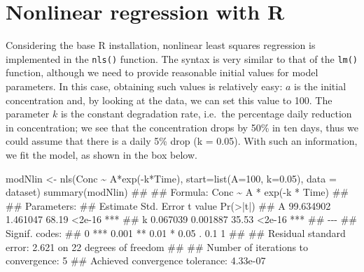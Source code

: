 \documentclass[a4paper,12pt,oneside]{book}
\newenvironment{Shaded}{\begin{snugshade}}{\end{snugshade}}
\newcommand{\DecValTok}[1]{#1}
\newcommand{\FloatTok}[1]{#1}
\newcommand{\SpecialCharTok}[1]{#1}
\newcommand{\DocumentationTok}[1]{#1}
\newcommand{\OtherTok}[1]{#1}
\newcommand{\FunctionTok}[1]{#1}
\newcommand{\AttributeTok}[1]{#1}
\newcommand{\NormalTok}[1]{#1}
\begin{document}
\hypertarget{nonlinear-regression-with-r}{%
\section{Nonlinear regression with R}\label{nonlinear-regression-with-r}}

Considering the base R installation, nonlinear least squares regression is implemented in the \texttt{nls()} function. The syntax is very similar to that of the \texttt{lm()} function, although we need to provide reasonable initial values for model parameters. In this case, obtaining such values is relatively easy: \(a\) is the initial concentration and, by looking at the data, we can set this value to 100. The parameter \(k\) is the constant degradation rate, i.e.~the percentage daily reduction in concentration; we see that the concentration drops by 50\% in ten days, thus we could assume that there is a daily 5\% drop (k = 0.05). With such an information, we fit the model, as shown in the box below.

\begin{Shaded}
\begin{Highlighting}[]
\NormalTok{modNlin }\OtherTok{\textless{}{-}} \FunctionTok{nls}\NormalTok{(Conc }\SpecialCharTok{\textasciitilde{}}\NormalTok{ A}\SpecialCharTok{*}\FunctionTok{exp}\NormalTok{(}\SpecialCharTok{{-}}\NormalTok{k}\SpecialCharTok{*}\NormalTok{Time), }
               \AttributeTok{start=}\FunctionTok{list}\NormalTok{(}\AttributeTok{A=}\DecValTok{100}\NormalTok{, }\AttributeTok{k=}\FloatTok{0.05}\NormalTok{), }
               \AttributeTok{data =}\NormalTok{ dataset)}
\FunctionTok{summary}\NormalTok{(modNlin)}
\DocumentationTok{\#\# }
\DocumentationTok{\#\# Formula: Conc \textasciitilde{} A * exp({-}k * Time)}
\DocumentationTok{\#\# }
\DocumentationTok{\#\# Parameters:}
\DocumentationTok{\#\#    Estimate Std. Error t value Pr(\textgreater{}|t|)    }
\DocumentationTok{\#\# A 99.634902   1.461047   68.19   \textless{}2e{-}16 ***}
\DocumentationTok{\#\# k  0.067039   0.001887   35.53   \textless{}2e{-}16 ***}
\DocumentationTok{\#\# {-}{-}{-}}
\DocumentationTok{\#\# Signif. codes:  }
\DocumentationTok{\#\# 0 \textquotesingle{}***\textquotesingle{} 0.001 \textquotesingle{}**\textquotesingle{} 0.01 \textquotesingle{}*\textquotesingle{} 0.05 \textquotesingle{}.\textquotesingle{} 0.1 \textquotesingle{} \textquotesingle{} 1}
\DocumentationTok{\#\# }
\DocumentationTok{\#\# Residual standard error: 2.621 on 22 degrees of freedom}
\DocumentationTok{\#\# }
\DocumentationTok{\#\# Number of iterations to convergence: 5 }
\DocumentationTok{\#\# Achieved convergence tolerance: 4.33e{-}07}
\end{Highlighting}
\end{Shaded}
\end{document}

